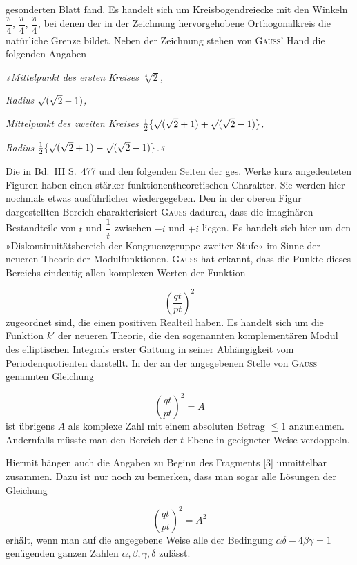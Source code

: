 \noindent gesonderten Blatt fand. Es handelt sich um Kreisbogendreiecke mit den Winkeln $\dfrac{\pi}{4}$, $\dfrac{\pi}{4}$, $\dfrac{\pi}{4}$, bei denen der in der Zeichnung hervorgehobene Orthogonalkreis die natürliche Grenze bildet. Neben der Zeichnung stehen von \textsc{Gauss}’ Hand die folgenden Angaben

\emph{»Mittelpunkt des ersten Kreises $\sqrt[4]{2}$,}

\emph{Radius $\mathord{\surd}(\sqrt{2}-1)$,}

\emph{Mittelpunkt des zweiten Kreises $\frac12\{\mathord{\surd}(\sqrt2+1)+\mathord{\surd}(\sqrt2-1)\}$,}

\emph{Radius $\frac12\{\mathord{\surd}(\sqrt2+1)-\mathord{\surd}(\sqrt2-1)\}$.«}

Die in Bd.~III S.~477 und den folgenden Seiten der ges. Werke kurz angedeuteten Figuren haben einen stärker funktionentheoretischen Charakter. Sie werden hier nochmals etwas ausführlicher wiedergegeben. Den in der oberen Figur dargestellten Bereich charakterisiert \textsc{Gauss} dadurch, dass die imaginären Bestandteile von $t$ und $\dfrac1t$ zwischen $-i$ und $+i$ liegen. Es handelt sich hier um den »Diskontinuitätsbereich der Kongruenzgruppe zweiter Stufe« im Sinne der neueren Theorie der Modulfunktionen. \textsc{Gauss} hat erkannt, dass die Punkte dieses Bereichs eindeutig allen komplexen Werten der Funktion

\begin{center}\resizebox{8.3cm}{!}{}\end{center}

\[
\left(\frac{qt}{pt}\right)^{2}
\]
zugeordnet sind, die einen positiven Realteil haben. Es handelt sich um die Funktion $k'$ der neueren Theorie, die den sogenannten komplementären Modul des elliptischen Integrals erster Gattung in seiner Abhängigkeit vom Periodenquotienten darstellt. In der an der angegebenen Stelle von \textsc{Gauss} genannten Gleichung

\[
\left(\frac{qt}{pt}\right)^{2} = A
\]
ist übrigens $A$ als komplexe Zahl mit einem absoluten Betrag $\leqq 1$ an\-zunehmen. Andernfalls müsste man den Bereich der $t$-Ebene in geeigneter Weise verdoppeln.

Hiermit hängen auch die Angaben zu Beginn des Fragments [3] unmittelbar zusammen. Dazu ist nur noch zu bemerken, dass man sogar alle Lösungen der Gleichung

\[
\left(\frac{qt}{pt}\right)^{2} = A^{2}
\]
erhält, wenn man auf die angegebene Weise alle der Bedingung $\alpha\delta - 4\beta\gamma = 1$ genügenden ganzen Zahlen $\alpha, \beta, \gamma, \delta$ zulässt.

